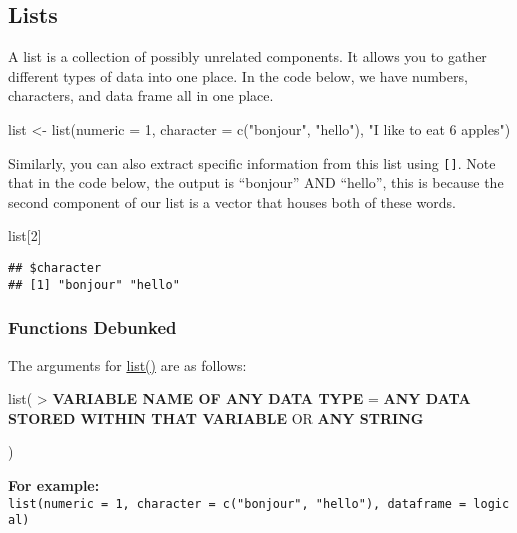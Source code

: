 \documentclass[
]{book}
\newenvironment{Shaded}{\begin{snugshade}}{\end{snugshade}}
\newcommand{\AttributeTok}[1]{\textcolor[rgb]{0.77,0.63,0.00}{#1}}
\newcommand{\DecValTok}[1]{\textcolor[rgb]{0.00,0.00,0.81}{#1}}
\newcommand{\FunctionTok}[1]{\textcolor[rgb]{0.00,0.00,0.00}{#1}}
\newcommand{\NormalTok}[1]{#1}
\newcommand{\OtherTok}[1]{\textcolor[rgb]{0.56,0.35,0.01}{#1}}
\newcommand{\StringTok}[1]{\textcolor[rgb]{0.31,0.60,0.02}{#1}}
\begin{document}
\hypertarget{lists}{%
\subsection{Lists}\label{lists}}

A list is a collection of possibly unrelated components. It allows you to gather different types of data into one place. In the code below, we have numbers, characters, and data frame all in one place.

\begin{Shaded}
\begin{Highlighting}[]
\NormalTok{list }\OtherTok{\textless{}{-}} \FunctionTok{list}\NormalTok{(}\AttributeTok{numeric =} \DecValTok{1}\NormalTok{, }\AttributeTok{character =} \FunctionTok{c}\NormalTok{(}\StringTok{"bonjour"}\NormalTok{, }\StringTok{"hello"}\NormalTok{), }\StringTok{"I like to eat 6 apples"}\NormalTok{)}
\end{Highlighting}
\end{Shaded}

Similarly, you can also extract specific information from this list using \texttt{{[}{]}}. Note that in the code below, the output is ``bonjour'' AND ``hello'', this is because the second component of our list is a vector that houses both of these words.

\begin{Shaded}
\begin{Highlighting}[]
\NormalTok{list[}\DecValTok{2}\NormalTok{]}
\end{Highlighting}
\end{Shaded}

\begin{verbatim}
## $character
## [1] "bonjour" "hello"
\end{verbatim}

\hypertarget{functions-debunked-1}{%
\subsubsection{Functions Debunked}\label{functions-debunked-1}}

The arguments for \href{https://www.rdocumentation.org/packages/base/versions/3.6.2/topics/list}{list()} are as follows:

list(
\textgreater{} \textbf{VARIABLE NAME OF ANY DATA TYPE} = \textbf{ANY DATA STORED WITHIN THAT VARIABLE} OR \textbf{ANY STRING}

)

\textbf{For example:} \texttt{list(numeric\ =\ 1,\ character\ =\ c("bonjour",\ "hello"),\ dataframe\ =\ logical)}
\end{document}
